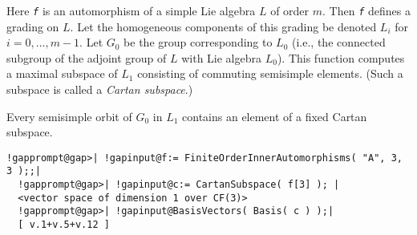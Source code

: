 \documentclass[a4paper,11pt]{report}
\begin{document}
{{{ Here \mbox{\texttt{\mdseries\slshape f}} is an automorphism of a simple Lie algebra $L$ of order $m$. Then \mbox{\texttt{\mdseries\slshape f}} defines a grading on $L$. Let the homogeneous components of this grading be denoted $L_i$ for $i=0,...,m-1$. Let $G_0$ be the group corresponding to $L_0$ (i.e., the connected subgroup of the adjoint group of $L$ with Lie algebra $L_0$). This function computes a maximal subspace of $L_1$ consisting of commuting semisimple elements. (Such a subspace is called a \emph{Cartan subspace}.) 

 Every semisimple orbit of $G_0$ in $L_1$ contains an element of a fixed Cartan subspace. 
\begin{Verbatim}[commandchars=!@|,fontsize=\small,frame=single,label=Example]
  !gapprompt@gap>| !gapinput@f:= FiniteOrderInnerAutomorphisms( "A", 3, 3 );;|
  !gapprompt@gap>| !gapinput@c:= CartanSubspace( f[3] ); |
  <vector space of dimension 1 over CF(3)>
  !gapprompt@gap>| !gapinput@BasisVectors( Basis( c ) );|
  [ v.1+v.5+v.12 ]
\end{Verbatim}
 }

 }

 }

 
\end{document}
